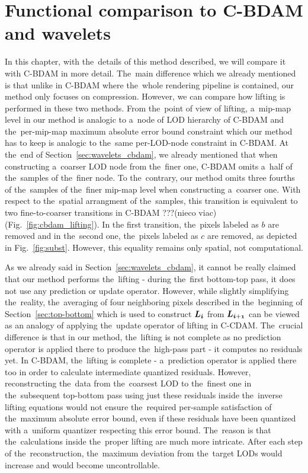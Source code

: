 \chapter{Functional comparison to C-BDAM and wavelets}\label{chap:cbdam_comp}

In this chapter, with the~details of this method described, we will compare it with C-BDAM in more detail. The~main difference which we already mentioned is that unlike in C-BDAM where the~whole rendering pipeline is contained, our method only focuses on compression. However, we can compare how lifting is performed in these two methods. From the~point of view of lifting, a~mip-map level in our method is analogic to a~node of LOD hierarchy of C-BDAM and the~per-mip-map maximum absolute error bound constraint which our method has to keep is analogic to the~same per-LOD-node constraint in C-BDAM. At the~end of Section~\ref{sec:wavelets_cbdam}, we already mentioned that when constructing a~coarser LOD node from the~finer one, C-BDAM omits a~half of the~samples of the~finer node. To the~contrary, our method omits three fourths of the~samples of the~finer mip-map level when constructing a~coarser one. With respect to the~spatial arrangment of the~samples, this transition is equivalent to two fine-to-coarser transitions in C-BDAM ???(nieco viac)(Fig.~\ref{fig:cbdam_lifting}). In the first transition, the~pixels labeled as $b$ are removed and in the~second one, the~pixels labeled as $c$ are removed, as depicted in Fig.~\ref{fig:subst}. However, this equality remains only spatial, not computational. 

As we already said in Section~\ref{sec:wavelets_cbdam}, it cannot be really claimed that our method performs the~lifting - during the~first bottom-top pass, it does not use any prediction or update operator. However, while slightly simplifying the~reality, the~averaging of four neighboring pixels described in the~beginning of Section~\ref{sec:top-bottom} which is used to construct $\lnorm{i}$ from $\lnorm{i+1}$ can be viewed as an analogy of applying the~update operator of lifting in C-CDAM. The~crucial difference is that in our method, the~lifting is not complete as no prediction operator is applied there to produce the~high-pass part - it computes no residuals yet. In C-BDAM, the~lifting is complete - a~prediction operator is applied there too in order to calculate intermediate quantized residuals. However, reconstructing the~data from the~coarsest LOD to the~finest one in the~subsequent top-bottom pass using just these residuals inside the~inverse lifting equations would not ensure the~required per-sample satisfaction of the~maximum absolute error bound, even if these residuals have been quantized with a~uniform quantizer respecting this error bound. The~reason is that the~calculations inside the~proper lifting are much more intricate. After each step of the~reconstruction, the~maximum deviation from the~target LODs would increase and would become uncontrollable. 

